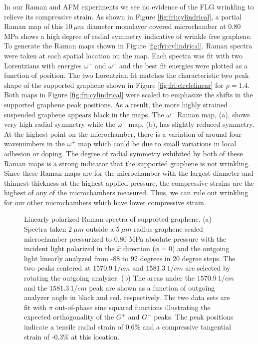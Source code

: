 In our Raman and AFM experiments we see no evidence of the FLG wrinkling to relieve its compressive strain.
As shown in Figure \ref{fig:fri:cylindrical}, a partial Raman map of this $10 \ \mu m$ diameter monolayer covered microchamber at 0.80 MPa shows a high degree of radial symmetry indicative of wrinkle free graphene.
To generate the Raman maps shown in Figure \ref{fig:fri:cylindrical}, Raman spectra were taken at each spatial location on the map.
Each spectra was fit with two Lorentzians with energies $\omega^+$ and $\omega^-$ and the best fit energies were plotted as a function of position.
The two Lorentzian fit matches the characteristic two peak shape of the supported graphene shown in Figure \ref{fig:fri:circlelinear} for $\rho=1.4$.
Both maps in Figure \ref{fig:fri:cylindrical} were scaled to emphasize the shifts in the supported graphene peak positions.
As a result, the more highly strained suspended graphene appears black in the maps.
The $\omega^-$ Raman map, (a), shows very high radial symmetry while the $\omega^+$ map, (b), has slightly reduced symmetry.  At the highest point on the microchamber, there is a variation of around four wavenumbers in the $\omega^+$ map which could be due to small variations in local adhesion or doping.
The degree of radial symmetry exhibited by both of these Raman maps is a strong indicator that the supported graphene is not wrinkling.
Since these Raman maps are for the microchamber with the largest diameter and thinnest thickness at the highest applied pressure, the compressive strains are the highest of any of the microchambers measured.
Thus, we can rule out wrinkling for our other microchambers which have lower compressive strain.

\begin{figure}
	\begin{center}
	
	\end{center}
	\caption[Linearly polarized Raman spectra of supported graphene]{\label{fig:fri:qualout} Linearly polarized Raman spectra of supported graphene.  (a) Spectra taken $2 \ \mu m$ outside a $5 \ \mu m$ radius graphene sealed microchamber pressurized to 0.80 MPa absolute pressure with the incident light polarized in the $\hat x$ direction ($\phi=0$) and the outgoing light linearly analyzed from -88 to 92 degrees in 20 degree steps.  The two peaks centered at $1570.9 \ 1/cm$ and $1581.3 \ 1/cm$ are selected by rotating the outgoing analyzer.  (b) The areas under the $1570.9 \ 1/cm$ and the $1581.3 \ 1/cm$ peak are shown as a function of outgoing analyzer angle in black and red, respectively.  The two data sets are fit with $\pi$ out-of-phase sine squared functions illustrating the expected orthogonality of the $G^+$ and $G^-$ peaks\cite{Huang2009}. The peak positions indicate a tensile radial strain of 0.6\% and a compressive tangential strain of -0.3\% at this location.}
\end{figure}

